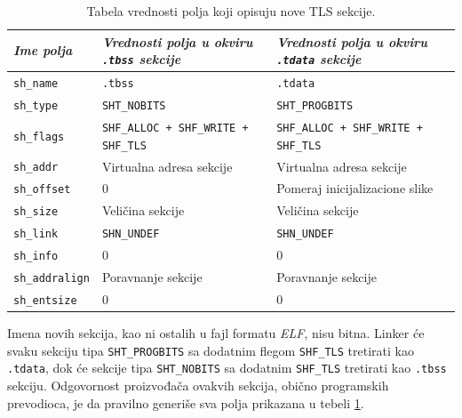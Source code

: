 \documentclass[12pt,oneside]{memoir}
\begin{document}
\begin{table}
		\begin{center}
	\begin{tabular}{ | l | p{5cm} | p{5cm} |}
		\hline
		\emph{Ime polja} & \emph{Vrednosti polja u okviru \texttt{.tbss} sekcije} & \emph{Vrednosti polja u okviru \texttt{.tdata} sekcije} \\ \hline
		\texttt{sh\_name} & \texttt{.tbss} & \texttt{.tdata} \\ \hline
		\texttt{sh\_type} & \texttt{SHT\_NOBITS} & \texttt{SHT\_PROGBITS} \\ \hline
		\texttt{sh\_flags} & \texttt{SHF\_ALLOC + SHF\_WRITE + SHF\_TLS} & \texttt{SHF\_ALLOC + SHF\_WRITE + SHF\_TLS} \\ \hline
		\texttt{sh\_addr} & Virtualna adresa sekcije & Virtualna adresa sekcije \\ \hline
		\texttt{sh\_offset} & 0 & Pomeraj inicijalizacione slike \\ \hline
		\texttt{sh\_size} & Veličina sekcije & Veličina sekcije \\ \hline
		\texttt{sh\_link} & \texttt{SHN\_UNDEF} & \texttt{SHN\_UNDEF} \\ \hline
		\texttt{sh\_info} & 0 & 0 \\ \hline
		\texttt{sh\_addralign} & Poravnanje sekcije & Poravnanje sekcije \\ \hline
		\texttt{sh\_entsize} & 0 & 0 \\ \hline
	\end{tabular}
	\end{center}
	\caption{\label{tab:tls_secs}Tabela vrednosti polja koji opisuju nove TLS sekcije.}
\end{table}

Imena novih sekcija, kao ni ostalih u fajl formatu \emph{ELF}, nisu bitna. Linker će svaku sekciju tipa \texttt{SHT\_PROGBITS} sa dodatnim flegom \texttt{SHF\_TLS} tretirati kao \texttt{.tdata}, dok će sekcije tipa \texttt{SHT\_NOBITS} sa dodatnim \texttt{SHF\_TLS} tretirati kao \texttt{.tbss} sekciju. Odgovornost proizvođača ovakvih sekcija, obično programskih prevodioca, je da pravilno generiše sva polja prikazana u tebeli \ref{tab:tls_secs}.
\end{document}
